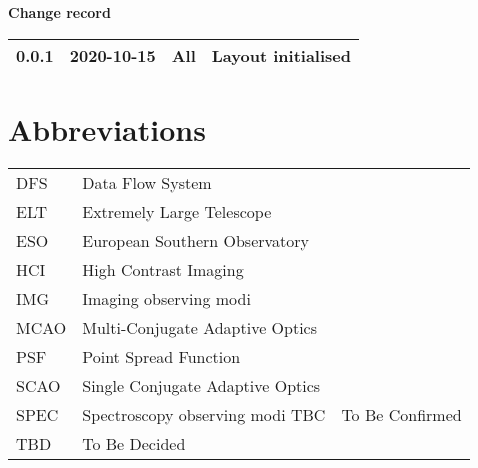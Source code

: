 
\dmdmaketitle


\begin{center}
  \textbf{Change record}

  \tabletail{\hline}

  \begin{supertabular}{|l|l|l|l|}
   0.0.1 & 2020-10-15 & All & Layout initialised \\
   \hline
  \end{supertabular}

\end{center}


\setcounter{tocdepth}{3}
\tableofcontents
\cleardoublepage



\section*{Abbreviations}
\label{sec:abbreviations}


\tablehead{}
\tabletail{}
\begin{supertabular}{ll}
  DFS & Data Flow System \\
  ELT & Extremely Large Telescope \\
  ESO & European Southern Observatory \\
  HCI & High Contrast Imaging \\
  IMG & Imaging observing modi \\
  MCAO & Multi-Conjugate Adaptive Optics \\
  PSF & Point Spread Function \\
  SCAO & Single Conjugate Adaptive Optics \\
  SPEC & Spectroscopy observing modi
  TBC & To Be Confirmed \\
  TBD & To Be Decided \\
\end{supertabular}


